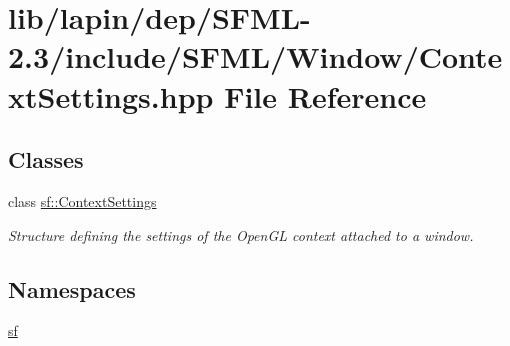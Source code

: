 \hypertarget{lapin_2dep_2_s_f_m_l-2_83_2include_2_s_f_m_l_2_window_2_context_settings_8hpp}{\section{lib/lapin/dep/\-S\-F\-M\-L-\/2.3/include/\-S\-F\-M\-L/\-Window/\-Context\-Settings.hpp File Reference}
\label{lapin_2dep_2_s_f_m_l-2_83_2include_2_s_f_m_l_2_window_2_context_settings_8hpp}
}
\subsection*{Classes}
\begin{DoxyCompactItemize}
\item 
class \hyperlink{structsf_1_1_context_settings}{sf\-::\-Context\-Settings}
\begin{DoxyCompactList}\small\item\em Structure defining the settings of the Open\-G\-L context attached to a window. \end{DoxyCompactList}\end{DoxyCompactItemize}
\subsection*{Namespaces}
\begin{DoxyCompactItemize}
\item 
\hyperlink{namespacesf}{sf}
\end{DoxyCompactItemize}
